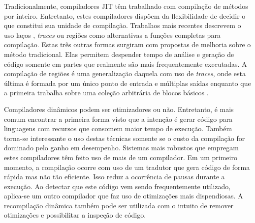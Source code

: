 Tradicionalmente, compiladores JIT têm trabalhado com compilação de métodos
por inteiro. Entretanto, estes compiladores
dispõem da flexibilidade de decidir o que constitui sua
unidade de compilação. Trabalhos mais recentes descrevem o uso laços
\cite{jitcompunits}, \textit{traces}
\cite{jitcompunits} ou regiões \cite{regionunit} como alternativas a
funções completas para compilação. Estas três outras formas surgiram
com propostas de melhoria \cite{regionunit}\cite{jitcompunits} sobre o
método tradicional. Elas permitem
despender tempo de análise e geração de código somente em partes que
realmente são mais
frequentemente executadas. A compilação de regiões é uma generalização
daquela com uso de \textit{traces}, onde esta última é formada
por um único ponto de entrada e múltiplas saídas \cite{jitcompunits}
enquanto que a primeira trabalha sobre uma coleção arbitrária de
blocos básicos \cite{dragonbook}.

Compiladores dinâmicos podem ser otimizadores ou não. Entretanto, é
mais comum encontrar a primeira forma visto que a intenção é gerar
código para linguagens com recursos que consomem maior tempo de
execução. Também torna-se interessante o uso destas técnicas somente
se o custo da compilação for dominado pelo ganho em desempenho.
 Sistemas \cite{holzle}\cite{judo}\cite{suganuma_ibm} mais
robustos que empregam estes compiladores têm feito uso de mais de um
compilador. Em um primeiro momento, a compilação ocorre com uso de um
tradutor que gera código de forma rápida mas não tão eficiente. Isso
reduz a ocorrência de pausas durante a execução. Ao
detectar que este código vem sendo frequentemente utilizado,
aplica-se um outro compilador que faz uso de otimizações mais
dispendiosas. A recompilação dinâmica \cite{holzle} também pode ser
utilizada com o intuito de remover otimizações e possibilitar a inspeção
de código.





